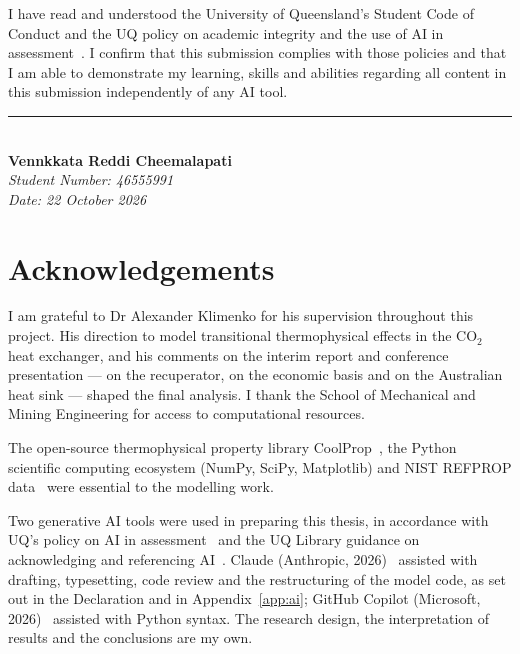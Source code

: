 \documentclass[12pt,a4paper]{report}
\begin{document}
\bigskip
\noindent I have read and understood the University of Queensland's Student
Code of Conduct and the UQ policy on academic integrity and the use of AI in
assessment~\cite{UQ2026AI}. I confirm that this submission complies with
those policies and that I am able to demonstrate my learning, skills and
abilities regarding all content in this submission independently of any AI
tool.

\bigskip\bigskip\bigskip
\noindent\rule{7cm}{0.4pt}\\[0.2cm]
\textbf{Vennkkata Reddi Cheemalapati}\\
\textit{Student Number: 46555991}\\
\textit{Date: 22 October 2026}
\clearpage

\chapter*{Acknowledgements}
I am grateful to Dr Alexander Klimenko for his supervision throughout this
project. His direction to model transitional thermophysical effects in the
CO$_2$ heat exchanger, and his comments on the interim report and conference
presentation --- on the recuperator, on the economic basis and on the
Australian heat sink --- shaped the final analysis. I thank the School of
Mechanical and Mining Engineering for access to computational resources.

The open-source thermophysical property library CoolProp~\cite{Bell2014},
the Python scientific computing ecosystem (NumPy, SciPy, Matplotlib) and
NIST REFPROP data~\cite{Lemmon2018} were essential to the modelling work.

Two generative AI tools were used in preparing this thesis, in accordance
with UQ's policy on AI in assessment~\cite{UQ2026AI} and the UQ Library
guidance on acknowledging and referencing AI~\cite{UQLib2026}. Claude
(Anthropic, 2026)~\cite{Anthropic2026} assisted with drafting, typesetting,
code review and the restructuring of the model code, as set out in the
Declaration and in Appendix~\ref{app:ai}; GitHub Copilot (Microsoft,
2026)~\cite{GitHubCopilot2026} assisted with Python syntax. The research
design, the interpretation of results and the conclusions are my own.
\clearpage
\end{document}
